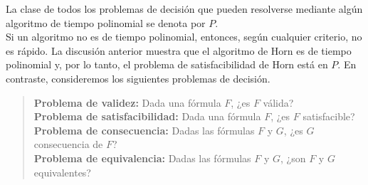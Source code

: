 \message{ !name(main.tex)}\documentclass[12pt,a4paper]{book}
\begin{document}
    La clase de todos los problemas de decisión que pueden resolverse mediante algún algoritmo de tiempo polinomial se
    denota por $P$.\\
    Si un algoritmo no es de tiempo polinomial, entonces, según cualquier criterio, no es rápido. La discusión anterior
    muestra que el algoritmo de Horn es de tiempo polinomial y, por lo tanto, el problema de satisfacibilidad de Horn está en
    $P$. En contraste, consideremos los siguientes problemas de decisión.

    \begin{quote}
        \textbf{Problema de validez:} Dada una fórmula $F$, ¿es $F$ válida?\\
        \textbf{Problema de satisfacibilidad:} Dada una fórmula $F$, ¿es $F$ satisfacible?\\
        \textbf{Problema de consecuencia:} Dadas las fórmulas $F$ y $G$, ¿es $G$ consecuencia de $F$?\\
        \textbf{Problema de equivalencia:} Dadas las fórmulas $F$ y $G$, ¿son $F$ y $G$ equivalentes?
    \end{quote}
\end{document}
